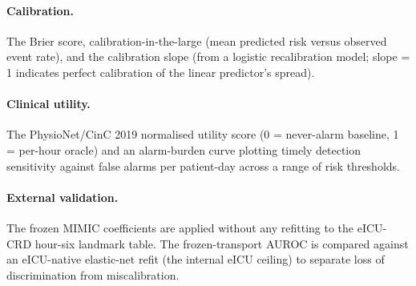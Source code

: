 \paragraph{Calibration.} The Brier score, calibration-in-the-large (mean
predicted risk versus observed event rate), and the calibration slope (from a
logistic recalibration model; slope = 1 indicates perfect calibration of the
linear predictor's spread).

\paragraph{Clinical utility.} The PhysioNet/CinC 2019 normalised utility
score (0 = never-alarm baseline, 1 = per-hour oracle) and an alarm-burden
curve plotting timely detection sensitivity against false alarms per
patient-day across a range of risk thresholds.

\paragraph{External validation.} The frozen MIMIC coefficients are applied
without any refitting to the eICU-CRD hour-six landmark table. The
frozen-transport AUROC is compared against an eICU-native elastic-net refit
(the internal eICU ceiling) to separate loss of discrimination from
miscalibration.
